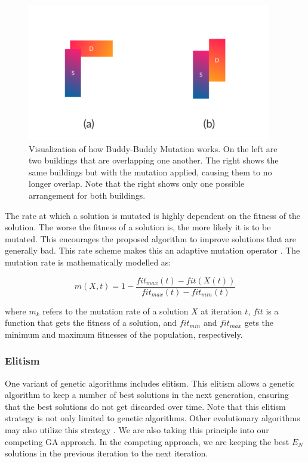\begin{figure}[h!]
	\centering
	\includegraphics{./images/chap06-validation/buddy-buddy-mutation.png}
	\caption{Visualization of how Buddy-Buddy Mutation works. On the left are two buildings that are overlapping one another. The right shows the same buildings but with the mutation applied, causing them to no longer overlap. Note that the right shows only one possible arrangement for both buildings.}
	\label{buddy-buddy-mutation-viz}
\end{figure}

The rate at which a solution is mutated is highly dependent on the fitness of the solution. The worse the fitness of a solution is, the more likely it is to be mutated. This encourages the proposed algorithm to improve solutions that are generally bad. This rate scheme makes this an adaptive mutation operator \cite{Jiang2018}. The mutation rate is mathematically modelled as:

\begin{equation}
	m(X, t) = 1 - \frac{fit_{max}(t) - fit(X(t))}{fit_{max}(t) - fit_{min}(t)}
\end{equation}

where $m_{k}$ refers to the mutation rate of a solution $X$ at iteration $t$, $fit$ is a function that gets the fitness of a solution, and $fit_{min}$ and $fit_{max}$ gets the minimum and maximum fitnesses of the population, respectively.

\subsubsection{Elitism}
One variant of genetic algorithms includes elitism. This elitism allows a genetic algorithm to keep a number of best solutions in the next generation, ensuring that the best solutions do not get discarded over time. Note that this elitism strategy is not only limited to genetic algorithms. Other evolutionary algorithms may also utilize this strategy \cite{Du2018}. We are also taking this principle into our competing GA approach. In the competing approach, we are keeping the best $E_{N}$ solutions in the previous iteration to the next iteration.

